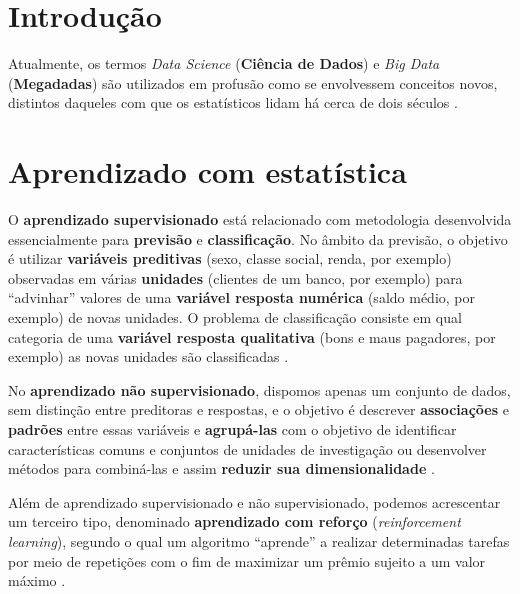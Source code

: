 \documentclass[
]{latex/krantz}
\renewenvironment{quote}{\begin{VF}}{\end{VF}}
\theoremstyle{definition}
\theoremstyle{definition}
\theoremstyle{definition}
\theoremstyle{definition}
\theoremstyle{remark}
\begin{document}
\hypertarget{introduuxe7uxe3o}{%
\section{Introdução}\label{introduuxe7uxe3o}}

\begin{quote}
Atualmente, os termos \emph{Data Science} (\textbf{Ciência de Dados}) e \emph{Big Data} (\textbf{Megadadas}) são utilizados em profusão como se envolvessem conceitos novos, distintos daqueles com que os estatísticos lidam há cerca de dois séculos \citep[p.~1]{MorettinSinger2022}.
\end{quote}

\hypertarget{aprendizado-com-estatuxedstica}{%
\section{Aprendizado com estatística}\label{aprendizado-com-estatuxedstica}}

\begin{quote}
O \textbf{aprendizado supervisionado} está relacionado com metodologia desenvolvida essencialmente para \textbf{previsão} e \textbf{classificação}. No âmbito da previsão, o objetivo é utilizar \textbf{variáveis preditivas} (sexo, classe social, renda, por exemplo) observadas em várias \textbf{unidades} (clientes de um banco, por exemplo) para ``advinhar'' valores de uma \textbf{variável resposta numérica} (saldo médio, por exemplo) de novas unidades. O problema de classificação consiste em qual categoria de uma \textbf{variável resposta qualitativa} (bons e maus pagadores, por exemplo) as novas unidades são classificadas \citep[p.~3]{MorettinSinger2022}.
\end{quote}

\begin{quote}
No \textbf{aprendizado não supervisionado}, dispomos apenas um conjunto de dados, sem distinção entre preditoras e respostas, e o objetivo é descrever \textbf{associações} e \textbf{padrões} entre essas variáveis e \textbf{agrupá-las} com o objetivo de identificar características comuns e conjuntos de unidades de investigação ou desenvolver métodos para combiná-las e assim \textbf{reduzir sua dimensionalidade} \citep[p.~3]{MorettinSinger2022}.
\end{quote}

\begin{quote}
Além de aprendizado supervisionado e não supervisionado, podemos acrescentar um terceiro tipo, denominado \textbf{aprendizado com reforço} (\emph{reinforcement learning}), segundo o qual um algoritmo ``aprende'' a realizar determinadas tarefas por meio de repetições com o fim de maximizar um prêmio sujeito a um valor máximo \citep[p.~3]{MorettinSinger2022}.
\end{quote}
\end{document}
